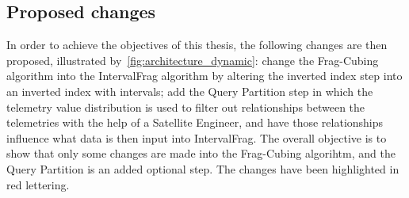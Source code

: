 \subsection{Proposed changes}\label{ch:prop:static:dynamic}

In order to achieve the objectives of this thesis, the following changes are then proposed, illustrated by~\autoref{fig:architecture_dynamic}: change the Frag-Cubing algorithm into the IntervalFrag algorithm by altering the inverted index step into an inverted index with intervals; add the Query Partition step in which the telemetry value distribution is used to filter out relationships between the telemetries with the help of a Satellite Engineer, and have those relationships influence what data is then input into IntervalFrag.
The overall objective is to show that only some changes are made into the Frag-Cubing algorihtm, and the Query Partition is an added optional step.
The changes have been highlighted in red lettering.

